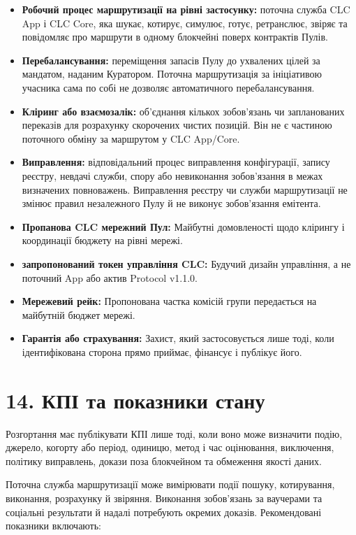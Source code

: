 \documentclass[11pt]{article}
\begin{document}
\begin{itemize}[leftmargin=*]
\item \textbf{Робочий процес маршрутизації на рівні застосунку:} поточна служба CLC App і CLC Core, яка шукає, котирує, симулює, готує, ретранслює, звіряє та повідомляє про маршрути в одному блокчейні поверх контрактів Пулів.
\item \textbf{Перебалансування:} переміщення запасів Пулу до ухвалених цілей за мандатом, наданим Куратором. Поточна маршрутизація за ініціативою учасника сама по собі не дозволяє автоматичного перебалансування.
\item \textbf{Кліринг або взаємозалік:} об'єднання кількох зобов'язань чи запланованих переказів для розрахунку скорочених чистих позицій. Він не є частиною поточного обміну за маршрутом у CLC App/Core.
\item \textbf{Виправлення:} відповідальний процес виправлення конфігурації, запису реєстру, невдачі служби, спору або невиконання зобов'язання в межах визначених повноважень. Виправлення реєстру чи служби маршрутизації не змінює правил незалежного Пулу й не виконує зобов'язання емітента.
\item \textbf{Пропанова CLC мережний Пул:} Майбутні домовленості щодо клірингу і координації бюджету на рівні мережі.
\item \textbf{запропонований токен управління CLC:} Будучий дизайн управління, а не поточний App або актив Protocol v1.1.0.
\item \textbf{Мережевий рейк:} Пропонована частка комісій групи передається на майбутній бюджет мережі.
\item \textbf{Гарантія або страхування:} Захист, який застосовується лише тоді, коли ідентифікована сторона прямо приймає, фінансує і публікує його.
\end{itemize}

\section*{14. КПІ та показники стану}

Розгортання має публікувати КПІ лише тоді, коли воно може визначити подію, джерело, когорту або період, одиницю, метод і час оцінювання, виключення, політику виправлень, докази поза блокчейном та обмеження якості даних.

Поточна служба маршрутизації може вимірювати події пошуку, котирування, виконання, розрахунку й звіряння. Виконання зобов'язань за ваучерами та соціальні результати й надалі потребують окремих доказів. Рекомендовані показники включають:
\end{document}

